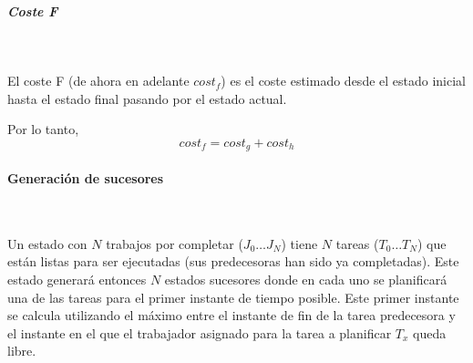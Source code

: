 \subparagraph{Coste F}~

El coste F (de ahora en adelante $cost_f$) es el coste estimado desde el estado inicial
hasta el estado final pasando por el estado actual.

Por lo tanto, \[cost_f = cost_g + cost_h\]

\pagebreak

\paragraph{Generación de sucesores}~

Un estado con $N$ trabajos por completar ($J_0 \dots J_N$)
tiene $N$ tareas ($T_0 \dots T_N$) que están listas para ser ejecutadas
(sus predecesoras han sido ya completadas).
Este estado generará entonces $N$ estados sucesores
donde en cada uno se planificará una de las tareas
para el primer instante de tiempo posible.
Este primer instante se calcula utilizando el
máximo entre el instante de fin de la tarea predecesora y
el instante en el que el trabajador asignado
para la tarea a planificar $T_x$ queda libre.

